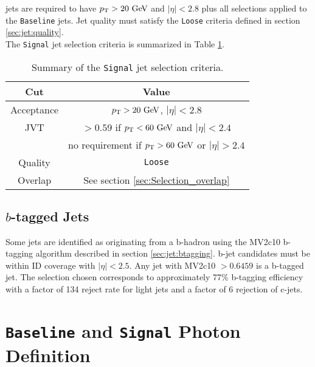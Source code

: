  jets are required to have $\pt > 20\gev$ and $|\eta|<2.8$ plus all selections applied to the {\tt Baseline} jets. Jet quality must satisfy the {\tt Loose} criteria defined in section \ref{sec:jet:quality}. \\

\indent The {\tt Signal} jet selection criteria is summarized in Table \ref{tb:jets:signal}. \\

\begin{table}[h!]
    \caption{Summary of the {\tt Signal} jet selection criteria.}
  \label{tb:jets:signal}
  \begin{center}
    \begin{tabular}{c|c} \hline \hline
      Cut & Value \\ \hline \hline
      Acceptance & $\pT > 20\gev$, $|\eta| < 2.8$ \\ \hline
      JVT & $> 0.59$ if $\pt < 60 \gev$ and $|\eta| < 2.4$ \\
              & no requirement if $\pt > 60 \gev$ or $|\eta| > 2.4$ \\ \hline
      Quality & {\tt Loose} \\ \hline
      Overlap & See section \ref{sec:Selection_overlap} \\ \hline
      \hline
    \end{tabular} 
  \end{center}
\end{table}%

\subsection{\boldmath $b$-tagged Jets}

\indent Some jets are identified as originating from a b-hadron using the MV2c10 b-tagging algorithm described in section \ref{sec:jet:btagging}.  b-jet candidates must be within ID coverage with $|\eta|<2.5$.  Any jet with MV2c10 $ > 0.6459$ is a b-tagged jet.  The selection chosen corresponds to approximately 77\% b-tagging efficiency with a factor of 134 reject rate for light jets and a factor of 6 rejection of c-jets.\\

\section{{\tt Baseline} and {\tt Signal} Photon Definition}
\label{sec:PhoDef}

